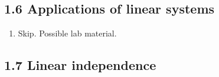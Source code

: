 \documentclass{article}
\begin{document}
\subsection{1.6 Applications of linear systems}

\begin{enumerate}

\item Skip. Possible lab material.

\end{enumerate}

\subsection{1.7 Linear independence}
\end{document}
